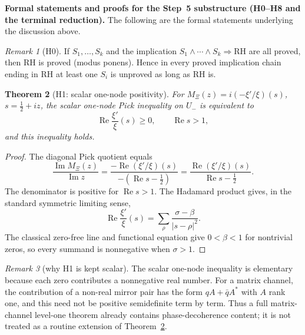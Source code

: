 \documentclass[11pt]{amsart}
\newtheorem{theorem}{Theorem}[section]
\theoremstyle{definition}
\theoremstyle{remark}
\newtheorem{remark}[theorem]{Remark}
\theoremstyle{definition}
\renewcommand{\Re}{\operatorname{Re}}
\renewcommand{\Im}{\operatorname{Im}}
\newcommand{\half}{\tfrac{1}{2}}
\begin{document}
\medskip\noindent\textbf{Formal statements and proofs for the Step~5 substructure (H0--H8 and the terminal reduction).}
The following are the formal statements underlying the discussion above.

\begin{remark}[H0]\label{lem:live-H0}
If $S_1,\ldots,S_k$ and the implication $S_1\wedge\cdots\wedge S_k\Rightarrow\mathrm{RH}$ are all
proved, then RH is proved (modus ponens).  Hence in every proved implication chain ending in RH at least
one $S_i$ is unproved as long as RH is.
\end{remark}

\begin{theorem}[H1: scalar one-node positivity]\label{thm:live-H1}
For $M_\Xi(z)=i(-\xi'/\xi)(s)$, $s=\half+iz$, the scalar one-node Pick inequality on $U_-$ is equivalent
to
\[
   \Re\frac{\xi'}{\xi}(s)\ge0,\qquad \Re s>1,
\]
and this inequality holds.
\end{theorem}

\begin{proof}
The diagonal Pick quotient equals
\[
   \frac{\Im M_\Xi(z)}{\Im z}
   =
   \frac{-\Re(\xi'/\xi)(s)}{-(\Re s-\half)}
   =
   \frac{\Re(\xi'/\xi)(s)}{\Re s-\half}.
\]
The denominator is positive for $\Re s>1$.  The Hadamard product gives, in the standard symmetric
limiting sense,
\[
   \Re\frac{\xi'}{\xi}(s)=\sum_\rho\frac{\sigma-\beta}{|s-\rho|^2}.
\]
The classical zero-free line and functional equation give $0<\beta<1$ for nontrivial zeros, so every
summand is nonnegative when $\sigma>1$.
\end{proof}

\begin{remark}[why H1 is kept scalar]\label{rmk:H1-matrix}
The scalar one-node inequality is elementary because each zero contributes a nonnegative real number.
For a matrix channel, the contribution of a non-real mirror pair has the form
$qA+\bar q A^*$ with $A$ rank one, and this need not be positive semidefinite term by term.  Thus a
full matrix-channel level-one theorem already contains phase-decoherence content; it is not treated as
a routine extension of Theorem~\ref{thm:live-H1}.
\end{remark}
\end{document}
